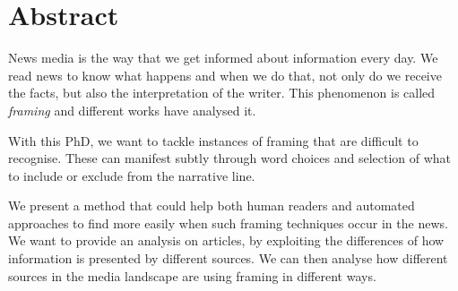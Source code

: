 \chapter*{Abstract}

News media is the way that we get informed about information every day.
We read news to know what happens and when we do that, not only do we receive the facts, but also the interpretation of the writer.
This phenomenon is called \emph{framing} and different works have analysed it.

With this PhD, we want to tackle instances of framing that are difficult to recognise.
These can manifest subtly through word choices and selection of what to include or exclude from the narrative line.

We present a method that could help both human readers and automated approaches to find more easily when such framing techniques occur in the news.
We want to provide an analysis on articles, by exploiting the differences of how information is presented by different sources.
We can then analyse how different sources in the media landscape are using framing in different ways.  
